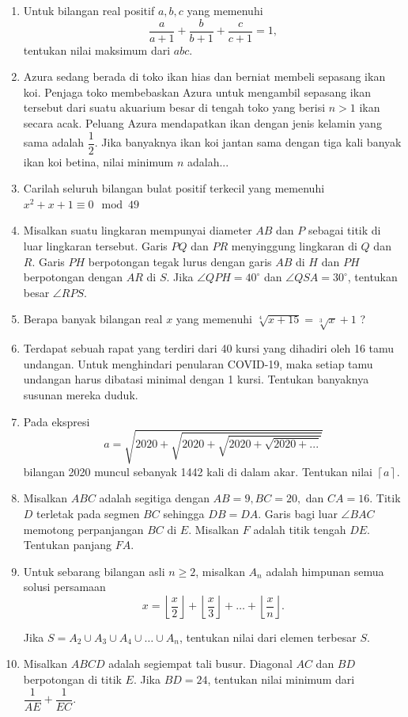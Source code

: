\documentclass[12pt]{extarticle}
\begin{document}
\begin{enumerate}
		\item Untuk bilangan real positif $a,b,c$ yang memenuhi $$\frac{a}{a+1}+\frac{b}{b+1}+\frac{c}{c+1} = 1,$$ tentukan nilai maksimum dari $abc$.
		
		\item Azura sedang berada di toko ikan hias dan berniat membeli sepasang ikan koi. Penjaga toko membebaskan Azura untuk mengambil sepasang ikan tersebut dari suatu akuarium besar di tengah toko yang berisi $n>1$ ikan secara acak. Peluang Azura mendapatkan ikan dengan jenis kelamin yang sama adalah $\dfrac12$. Jika banyaknya ikan koi jantan sama dengan tiga kali banyak ikan koi betina, nilai minimum $n$ adalah...
		
		\item Carilah seluruh bilangan bulat positif terkecil yang memenuhi $x^2+x+1 \equiv 0 \mod 49$
		
		\item Misalkan suatu lingkaran mempunyai diameter $AB$ dan $P$ sebagai titik di luar lingkaran tersebut. Garis $PQ$ dan $PR$ menyinggung lingkaran di $Q$ dan $R$. Garis $PH$ berpotongan tegak lurus dengan garis $AB$ di $H$ dan $PH$ berpotongan dengan $AR$ di $S$. Jika $\angle QPH = 40^\circ$ dan $\angle QSA = 30^\circ$, tentukan besar $\angle RPS$.
		
		\item Berapa banyak bilangan real $x$ yang memenuhi $\sqrt[4]{x+15} = \sqrt[3]{x}+1$ ?
		
		\item  Terdapat sebuah rapat yang terdiri dari 40 kursi yang dihadiri oleh 16 tamu undangan.
		Untuk menghindari penularan COVID-19, maka setiap tamu undangan harus dibatasi minimal
		dengan 1 kursi. Tentukan banyaknya susunan mereka duduk.

		
		\item Pada ekspresi $$a= \sqrt{2020+\sqrt{2020+\sqrt{2020+\sqrt{2020+...}}}}$$
		bilangan 2020 muncul sebanyak 1442 kali di dalam akar. Tentukan nilai $\left \lceil a \right \rceil$.
		
		\item Misalkan $ABC$ adalah segitiga dengan $AB=9, BC=20,$ dan $CA=16$. Titik $D$ terletak pada segmen $BC$ sehingga $DB=DA$. Garis bagi luar $\angle BAC$ memotong perpanjangan $BC$ di $E$. Misalkan $F$ adalah titik tengah $DE$. Tentukan panjang $FA$.
		
		\item Untuk sebarang bilangan asli $n \ge 2$, misalkan $A_n$ adalah himpunan semua solusi persamaan $$x=\left\lfloor \frac{x}{2}\right \rfloor+\left\lfloor \frac{x}{3}\right \rfloor+\dots+\left\lfloor\frac{x}{n} \right \rfloor.$$
		
		Jika $S = A_2 \cup A_3 \cup A_4 \cup \dots \cup A_n$, tentukan nilai dari elemen terbesar $S$.
		
		\item Misalkan $ABCD$ adalah segiempat tali busur. Diagonal $AC$ dan $BD$ berpotongan di titik $E$. Jika $BD=24$, tentukan nilai minimum dari $\dfrac{1}{AE}+\dfrac{1}{EC}$.
		
\end{enumerate}
\end{document}
